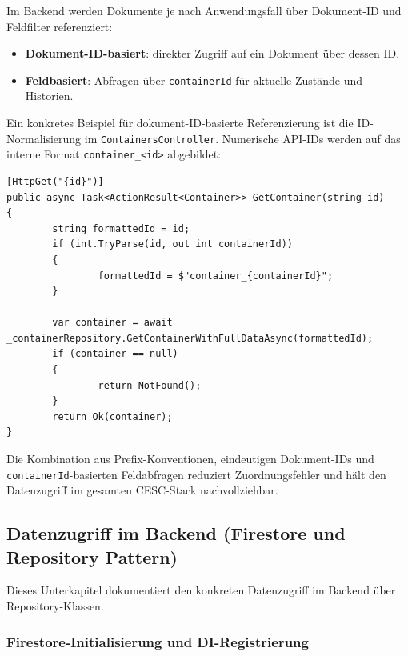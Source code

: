 Im Backend werden Dokumente je nach Anwendungsfall über Dokument-ID und Feldfilter referenziert:

\begin{itemize}
        \item \textbf{Dokument-ID-basiert}: direkter Zugriff auf ein Dokument über dessen ID.
        \item \textbf{Feldbasiert}: Abfragen über \texttt{containerId} für aktuelle Zustände und Historien.
\end{itemize}

Ein konkretes Beispiel für dokument-ID-basierte Referenzierung ist die ID-Normalisierung im \texttt{ContainersController}. Numerische API-IDs werden auf das interne Format \texttt{container\_<id>} abgebildet:

\begin{samepage}
\begin{lstlisting}[language={[Sharp]C},caption={ID-Normalisierung im ContainersController},label={lst:db:ids:container-normalization},basicstyle=\ttfamily\small,breaklines=true,breakatwhitespace=false,columns=fullflexible]
[HttpGet("{id}")]
public async Task<ActionResult<Container>> GetContainer(string id)
{
        string formattedId = id;
        if (int.TryParse(id, out int containerId))
        {
                formattedId = $"container_{containerId}";
        }

        var container = await _containerRepository.GetContainerWithFullDataAsync(formattedId);
        if (container == null)
        {
                return NotFound();
        }
        return Ok(container);
}
\end{lstlisting}
\end{samepage}

Die Kombination aus Prefix-Konventionen, eindeutigen Dokument-IDs und \texttt{containerId}-basierten Feldabfragen reduziert Zuordnungsfehler und hält den Datenzugriff im gesamten CESC-Stack nachvollziehbar.

\subsection{Datenzugriff im Backend (Firestore und Repository Pattern)}

Dieses Unterkapitel dokumentiert den konkreten Datenzugriff im Backend über Repository-Klassen.

\subsubsection{Firestore-Initialisierung und DI-Registrierung}


